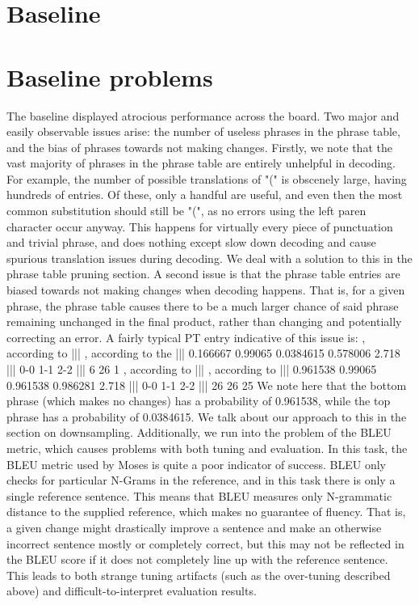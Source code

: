 \documentclass[11pt,letterpaper]{article}
\begin{document}
\section{Baseline}

\section{Baseline problems}
\indent The baseline displayed atrocious performance across the board. Two major and easily observable 
issues arise: the number of useless phrases in the phrase table, and the bias of phrases towards not 
making changes. \newline
\indent Firstly, we note that the vast majority of phrases in the phrase table are entirely unhelpful 
in decoding. For example, the number of possible translations of "(" is obscenely large, having hundreds
of entries. Of these, only a handful are useful, and even then the most common substitution should still 
be "(", as no errors using the left paren character occur anyway. This happens for virtually every piece 
of punctuation and trivial phrase, and does nothing except slow down decoding and cause spurious translation 
issues during decoding. We deal with a solution to this in the phrase table pruning section. \newline
\indent A second issue is that the phrase table entries are biased towards not making changes when 
decoding happens. That is, for a given phrase, the phrase table causes there to be a much larger chance 
of said phrase remaining unchanged in the final product, rather than changing and potentially correcting 
an error. A fairly typical PT entry indicative of this issue is: \newline
\newline
\indent , according to ||| , according to the ||| 0.166667 0.99065 0.0384615 0.578006 2.718 ||| 0-0 1-1 2-2 ||| 6 26 1 \newline \newline
\indent , according to ||| , according to ||| 0.961538 0.99065 0.961538 0.986281 2.718 ||| 0-0 1-1 2-2 ||| 26 26 25 \newline \newline
\indent We note here that the bottom phrase (which makes no changes) has a probability of 
0.961538, while the top phrase has a probability of 0.0384615. We talk about our approach to this 
in the section on downsampling. \newline
\indent Additionally, we run into the problem of the BLEU metric, which causes problems with both 
tuning and evaluation. In this task, the BLEU metric used by Moses is quite a poor indicator 
of success. BLEU only checks for particular N-Grams in the reference, and in this task there is only a 
single reference sentence. This means that BLEU measures only N-grammatic distance to the supplied reference, 
which makes no guarantee of fluency. That is, a given change might drastically improve a sentence and make an 
otherwise incorrect sentence mostly or completely correct, but this may not be reflected in the BLEU score if 
it does not completely line up with the reference sentence. This leads to both strange tuning artifacts (such 
as the over-tuning described above) and difficult-to-interpret evaluation results. \newline
\end{document}
